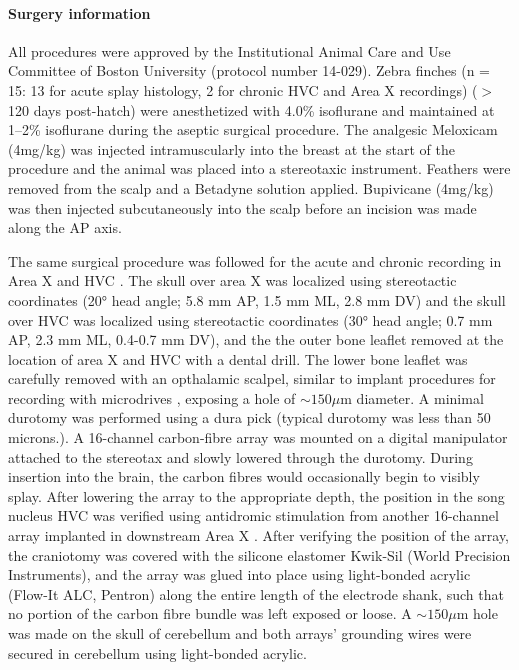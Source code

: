 \documentclass[10pt,letterpaper]{article}
\let\oldmarginpar\marginpar
\renewcommand{\marginpar}[1]{\oldmarginpar{\linespread{1}\scriptsize{#1}}}
\renewcommand{\subsubsection}[1]{\paragraph{#1}}
\begin{document}
\subsubsection{Surgery information}

All procedures were approved by the Institutional Animal Care and Use
Committee of Boston University (protocol number 14-029). Zebra finches
(n = 15: 13 for acute splay histology, 2\marginpar{Include the third?}
for chronic HVC and Area X recordings) ($>$120 days post-hatch) were
anesthetized with 4.0\% isoflurane and maintained at 1--2\% isoflurane
during the aseptic surgical procedure. The analgesic Meloxicam
(4mg/kg) was injected intramuscularly into the breast at the start of
the procedure and the animal was placed into a stereotaxic
instrument. Feathers were removed from the scalp and a Betadyne
solution applied. Bupivicane (4mg/kg) was then injected subcutaneously
into the scalp before an incision was made along the AP axis.

The same surgical procedure was followed for the acute and chronic
recording in Area X and HVC \cite{Guitchounts2013electrode}. The skull
over area X was localized using stereotactic coordinates (20° head
angle; 5.8 mm AP, 1.5 mm ML, 2.8 mm DV) and the skull over HVC was
localized using stereotactic coordinates (30° head angle; 0.7 mm AP,
2.3 mm ML, 0.4-0.7 mm DV), and the the outer bone leaflet removed at
the location of area X and HVC with a dental drill. The lower bone
leaflet was carefully removed with an opthalamic scalpel, similar to
implant procedures for recording with microdrives
\cite{Long2010synfire}, exposing a hole of $\sim 150 \mu$m diameter. A
minimal durotomy was performed using a dura pick (typical durotomy was
less than 50 microns.). A 16-channel carbon-fibre array
\cite{Guitchounts2013electrode} was mounted on a digital manipulator
attached to the stereotax and slowly lowered through the
durotomy. During insertion into the brain, the carbon fibres would
occasionally begin to visibly splay. After lowering the array to the
appropriate depth, the position in the song nucleus HVC was verified
using antidromic stimulation from another 16-channel array implanted
in downstream Area X
\cite{Hahnloser2002sparse,Guitchounts2013electrode}.  After verifying
the position of the array, the craniotomy was covered with the
silicone elastomer Kwik-Sil (World Precision Instruments), and the
array was glued into place using light-bonded acrylic (Flow-It ALC,
Pentron) along the entire length of the electrode shank, such that no
portion of the carbon fibre bundle was left exposed or loose. A $\sim
150\mu$m hole was made on the skull of cerebellum and both arrays’
grounding wires were secured in cerebellum using light-bonded acrylic.
\end{document}
